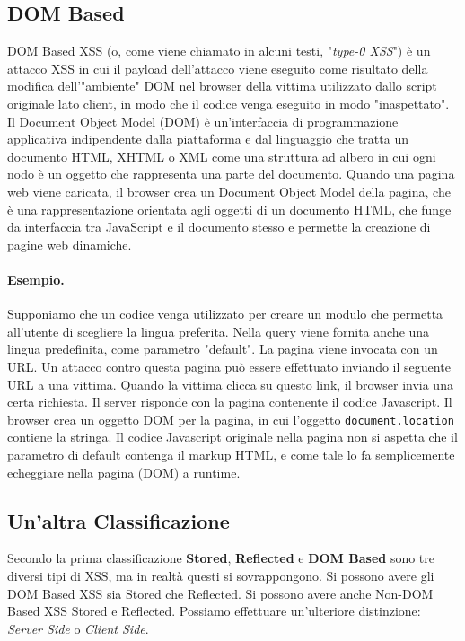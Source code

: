 \subsection{DOM Based}

DOM Based XSS (o, come viene chiamato in alcuni testi, "\textit{type-0 XSS}") è
un attacco XSS in
cui il payload dell'attacco viene eseguito come risultato della modifica
dell'"ambiente" DOM
nel browser della vittima utilizzato dallo script originale lato client,
in modo che il codice
venga eseguito in modo "inaspettato".
Il Document Object Model (DOM) è un'interfaccia di programmazione applicativa
indipendente dalla piattaforma e dal linguaggio che tratta un documento HTML,
XHTML o XML
come una struttura ad albero in cui ogni nodo è un oggetto che rappresenta una
parte del documento.
Quando una pagina web viene caricata, il browser crea un Document Object Model
della pagina, che è una rappresentazione orientata agli oggetti di un documento
HTML, che funge
da interfaccia tra JavaScript e il documento stesso e permette la creazione di
pagine web dinamiche.

\paragraph{Esempio.}
Supponiamo che un codice venga utilizzato per creare un modulo che permetta
all'utente di
scegliere la lingua preferita. Nella query viene fornita anche una lingua
predefinita, come
parametro "default".
La pagina viene invocata con un URL. Un attacco contro questa pagina può essere
effettuato inviando il seguente URL a una vittima. Quando la vittima clicca su
questo link, il
browser invia una certa richiesta. Il server risponde con la pagina contenente il
codice Javascript. Il browser crea un oggetto DOM per la pagina, in cui l'oggetto
\verb|document.location| contiene la stringa.
Il codice Javascript originale nella pagina non si aspetta che il parametro di
default contenga
il markup HTML, e come tale lo fa semplicemente echeggiare nella pagina (DOM) a
runtime.

\subsection{Un'altra Classificazione}

Secondo la prima classificazione \textbf{Stored}, \textbf{Reflected} e
\textbf{DOM Based} sono tre diversi tipi di XSS, ma in
realtà questi si sovrappongono. Si possono avere gli DOM Based XSS sia Stored che
Reflected. Si possono avere anche Non-DOM Based XSS Stored e Reflected.
Possiamo effettuare un'ulteriore distinzione: \textit{Server Side} o \textit{Client Side}.

